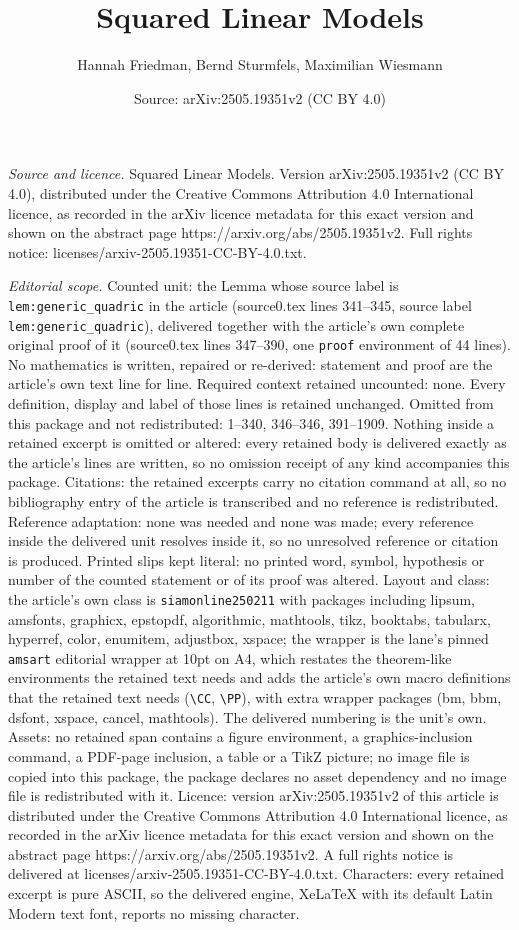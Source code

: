 \documentclass[10pt,a4paper]{amsart}
\title[Squared Linear Models]{Squared Linear Models}
\author{Hannah Friedman, Bernd Sturmfels, Maximilian Wiesmann}
\date{Source: arXiv:2505.19351v2 (CC BY 4.0)}
\begin{document}
\maketitle

\noindent\emph{Source and licence.} Squared Linear Models. Version arXiv:2505.19351v2 (CC BY 4.0), distributed under the Creative Commons Attribution 4.0 International licence, as recorded in the arXiv licence metadata for this exact version and shown on the abstract page https://arxiv.org/abs/2505.19351v2. Full rights notice: licenses/arxiv-2505.19351-CC-BY-4.0.txt.\par\smallskip

\noindent\textit{Editorial scope.} Counted unit: the Lemma whose source label is \texttt{lem:generic\_quadric} in the article (source0.tex lines 341--345, source label \texttt{lem:generic\_quadric}), delivered together with the article's own complete original proof of it (source0.tex lines 347--390, one \texttt{proof} environment of 44 lines). No mathematics is written, repaired or re-derived: statement and proof are the article's own text line for line. Required context retained uncounted: none. Every definition, display and label of those lines is retained unchanged. Omitted from this package and not redistributed: 1--340, 346--346, 391--1909. Nothing inside a retained excerpt is omitted or altered: every retained body is delivered exactly as the article's lines are written, so no omission receipt of any kind accompanies this package. Citations: the retained excerpts carry no citation command at all, so no bibliography entry of the article is transcribed and no reference is redistributed. Reference adaptation: none was needed and none was made; every reference inside the delivered unit resolves inside it, so no unresolved reference or citation is produced. Printed slips kept literal: no printed word, symbol, hypothesis or number of the counted statement or of its proof was altered. Layout and class: the article's own class is \texttt{siamonline250211} with packages including lipsum, amsfonts, graphicx, epstopdf, algorithmic, mathtools, tikz, booktabs, tabularx, hyperref, color, enumitem, adjustbox, xspace; the wrapper is the lane's pinned \texttt{amsart} editorial wrapper at 10pt on A4, which restates the theorem-like environments the retained text needs and adds the article's own macro definitions that the retained text needs (\texttt{\textbackslash CC}, \texttt{\textbackslash PP}), with extra wrapper packages (bm, bbm, dsfont, xspace, cancel, mathtools). The delivered numbering is the unit's own. Assets: no retained span contains a figure environment, a graphics-inclusion command, a PDF-page inclusion, a table or a TikZ picture; no image file is copied into this package, the package declares no asset dependency and no image file is redistributed with it. Licence: version arXiv:2505.19351v2 of this article is distributed under the Creative Commons Attribution 4.0 International licence, as recorded in the arXiv licence metadata for this exact version and shown on the abstract page https://arxiv.org/abs/2505.19351v2. A full rights notice is delivered at licenses/arxiv-2505.19351-CC-BY-4.0.txt. Characters: every retained excerpt is pure ASCII, so the delivered engine, XeLaTeX with its default Latin Modern text font, reports no missing character.
\end{document}
